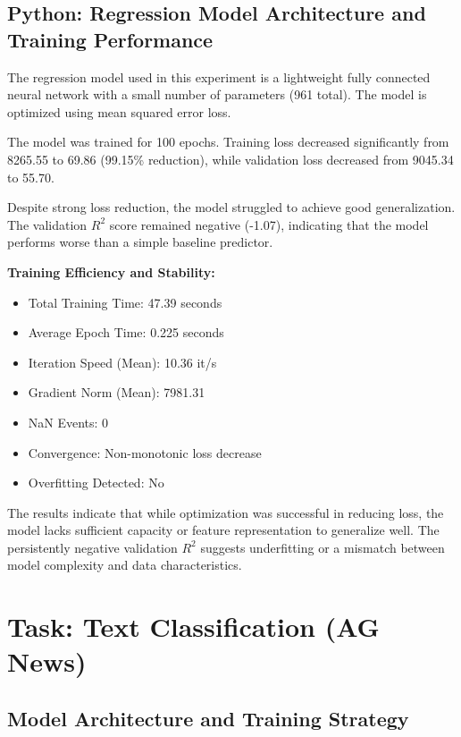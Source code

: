 \documentclass{ieeeaccess}
\begin{document}
\newpage
\subsection{Python: Regression Model Architecture and Training Performance}

The regression model used in this experiment is a lightweight fully connected neural network with a small number of parameters (961 total). The model is optimized using mean squared error loss.



The model was trained for 100 epochs. Training loss decreased significantly from 8265.55 to 69.86 (99.15\% reduction), while validation loss decreased from 9045.34 to 55.70.

Despite strong loss reduction, the model struggled to achieve good generalization. The validation $R^2$ score remained negative (-1.07), indicating that the model performs worse than a simple baseline predictor.



\textbf{Training Efficiency and Stability:}
\begin{itemize}
    \item Total Training Time: 47.39 seconds
    \item Average Epoch Time: 0.225 seconds
    \item Iteration Speed (Mean): 10.36 it/s
    \item Gradient Norm (Mean): 7981.31
    \item NaN Events: 0
    \item Convergence: Non-monotonic loss decrease
    \item Overfitting Detected: No
\end{itemize}

The results indicate that while optimization was successful in reducing loss, the model lacks sufficient capacity or feature representation to generalize well. The persistently negative validation $R^2$ suggests underfitting or a mismatch between model complexity and data characteristics.




\section{Task: Text Classification (AG News)}
\subsection{Model Architecture and Training Strategy}
\end{document}
